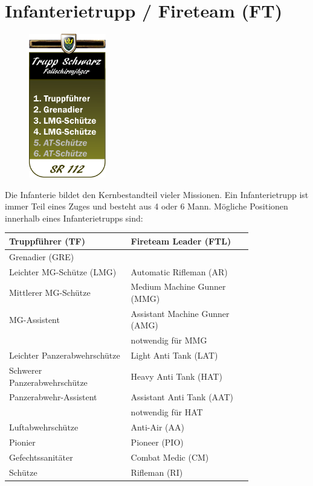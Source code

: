 \section{Infanterietrupp / Fireteam (FT)}
\begin{figure}
	\centering 
	\includegraphics[width=0.3\textwidth]{./img/truppenordnung/infanterie/infanterie}
\end{figure}
Die Infanterie bildet den Kernbestandteil vieler Missionen. Ein Infanterietrupp ist immer Teil eines Zuges und besteht aus 4 oder 6 Mann. Mögliche Positionen innerhalb eines Infanterietrupps sind:

	\begin{longtable}{p{0.4\linewidth}p{0.4\linewidth}}
		Truppführer (TF) & Fireteam Leader (FTL)\\
		\hline
		Grenadier (GRE) & \\
		\hline
		Leichter MG-Schütze (LMG) & Automatic Rifleman (AR)\\
		\hline
		Mittlerer MG-Schütze & Medium Machine Gunner (MMG) \\
		\hline
		MG-Assistent & Assistant Machine Gunner (AMG)\\ 
		& notwendig für MMG\\
		\hline
		Leichter Panzerabwehrschütze & Light Anti Tank (LAT)\\
		\hline	
		Schwerer Panzerabwehrschütze & Heavy Anti Tank (HAT)\\
		\hline	
		Panzerabwehr-Assistent & Assistant Anti Tank (AAT)\\ 
		& notwendig für HAT\\
		\hline	
		Luftabwehrschütze & Anti-Air (AA)\\
		\hline
		Pionier & Pioneer (PIO)\\
		\hline	
		Gefechtssanitäter & Combat Medic (CM)\\
		\hline				
		Schütze & Rifleman (RI)\\
		\hline									
	\end{longtable}


